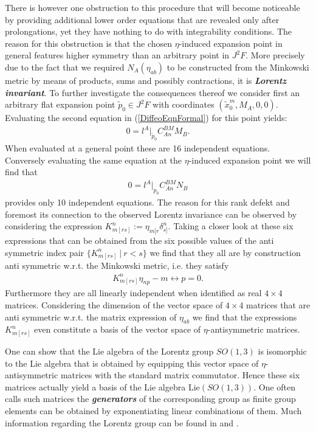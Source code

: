 \documentclass[a4paper,12pt, DIV=14, BCOR=5mm, twoside, headsepline]{scrbook}
\begin{document}
There is however one obstruction to this procedure that will become noticeable by providing additional lower order equations that are revealed only after prolongations, yet they have nothing to do with integrability conditions. 
The reason for this obstruction is that the chosen $\eta$-induced expansion point in general features higher symmetry than an arbitrary point in $J^2F$. More precisely due to the fact that we required $N_A(\eta_{ab})$ to be constructed from the Minkowski metric by means of products, sums and possibly contractions, it is \textit{\textbf{Lorentz invariant}}. To further investigate the consequences thereof we consider first an arbitrary flat expansion point $\tilde{p}_0 \in J^2F$ with coordinates $(\tilde{x}_0^m,M_A,0,0)$. Evaluating the second equation in (\ref{DiffeoEqnFormal}) for this point yields:
\begin{align}
    0 = l^A \vert _{\tilde{p}_0} C^{BM}_{An}M_B.
\end{align}
When evaluated at a general point these are 16 independent equations. 
Conversely evaluating the same equation at the $\eta$-induced expansion point we will find that 
\begin{align}\label{RankDef}
    0 = l^A \vert_{p_0} C^{BM}_{An}N_B
\end{align}
provides only 10 independent equations. The reason for this rank defekt and foremost its connection to the observed Lorentz invariance can be observed by considering the expression $K_{m[rs]}^n :=\eta_{m[r}\delta_{s]}^n$. 
Taking a closer look at these six expressions that can be obtained from the six possible values of the anti symmetric index pair  $\{K_{m[rs]}^n \ \vert \ r < s \} $ we find that they all are by construction anti symmetric w.r.t. the Minkowski metric, i.e. they satisfy 
\begin{align}
K_{m[rs]}^n\eta_{n p} - m \leftrightarrow p = 0.
\end{align}
Furthermore they are all linearly independent when identified as real $4 \times 4$ matrices. Considering the dimension of the vector space of $4 \times 4$ matrices that are anti symmetric w.r.t. the matrix expression of $\eta_{ab}$ we find that  the expressions $K_{m[rs]}^n$ even constitute a basis of the vector space of $\eta$-antisymmetric matrices. 

%
%
One can show that the Lie algebra of the Lorentz group $SO(1,3)$ is isomorphic to the Lie algebra that is obtained by equipping this vector space of $\eta$-antisymmetric matrices with the standard matrix commutator. Hence these six matrices actually yield a basis of the Lie algebra $\mathrm{Lie}(SO(1,3))$. One often calls such matrices the \textit{\textbf{generators}} of the corresponding group as finite group elements can be obtained by exponentiating linear combinations of them. Much information regarding the Lorentz group can be found in \cite{doi:10.1142/p199} and \cite{naimark2014linear}.
\end{document}
